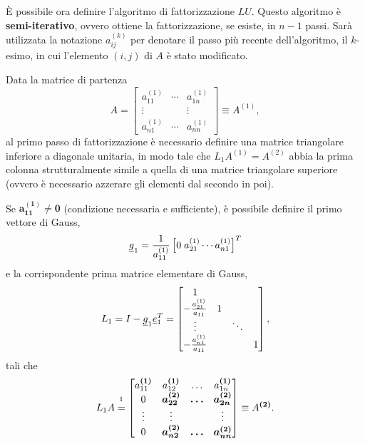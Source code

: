 È possibile ora definire l'algoritmo di fattorizzazione $LU$. Questo algoritmo è \textbf{semi-iterativo}, ovvero ottiene la fattorizzazione, se esiste, in $n-1$ passi. Sarà utilizzata la notazione $a_{ij}^{(k)}$ per denotare il passo più recente dell'algoritmo, il $k$-esimo, in cui l'elemento $(i,j)$ di $A$ è stato modificato.

Data la matrice di partenza
\begin{equation}\label{eq:A1}
    A=\begin{bmatrix}
        a_{11}^{(1)} & \cdots & a_{1n}^{(1)}\\
        \vdots & & \vdots\\
        a_{n1}^{(1)}&\cdots & a_{nn}^{(1)}
    \end{bmatrix}\equiv A^{(1)},
\end{equation}
al primo passo di fattorizzazione è necessario definire una matrice triangolare inferiore a diagonale unitaria, in modo tale che $L_1 A^{(1)}=A^{(2)}$ abbia la prima colonna strutturalmente simile a quella di una matrice triangolare superiore (ovvero è necessario azzerare gli elementi dal secondo in poi).

Se $\boldsymbol{a_{11}^{(1)}\neq 0}$ (condizione necessaria e sufficiente), è possibile definire il primo vettore di Gauss,\begin{equation}\label{eq:1oVettElemGauss}
    \uline g_1=\frac{1}{a_{11}^{(1)}}\left[0\; a_{21}^{(1)}\cdots a_{n1}^{(1)}\right]^T
\end{equation}
e la corrispondente prima matrice elementare di Gauss, 
\begin{equation}
    L_1=I-\uline g_1\uline e_1^T=\begin{bmatrix}
        1\\
        -\frac{a_{21}^{(1)}}{a_{11}} & 1\\
        \vdots & &\ddots\\
        -\frac{a_{n1}^{(1)}}{a_{11}} & & &1
    \end{bmatrix},
\end{equation}
tali che
\begin{equation*}
    L_1 A\overset{\footnotemark}{=}
    \begin{bmatrix}
        a_{11}^{\boldsymbol{(1)}} & a_{12}^{\boldsymbol{(1)}} & \hdots & a_{1n}^{\boldsymbol{(1)}}\\
        0 & \boldsymbol{a_{22}^{(2)}} & \boldsymbol\hdots & \boldsymbol{a_{2n}^{(2)}}\\
        \vdots & \boldsymbol\vdots & & \boldsymbol\vdots\\
        0 & \boldsymbol{a_{n2}^{(2)}} & \boldsymbol\hdots & \boldsymbol{a_{nn}^{(2)}}
    \end{bmatrix}\equiv A^{\boldsymbol{(2)}}.
\end{equation*}

